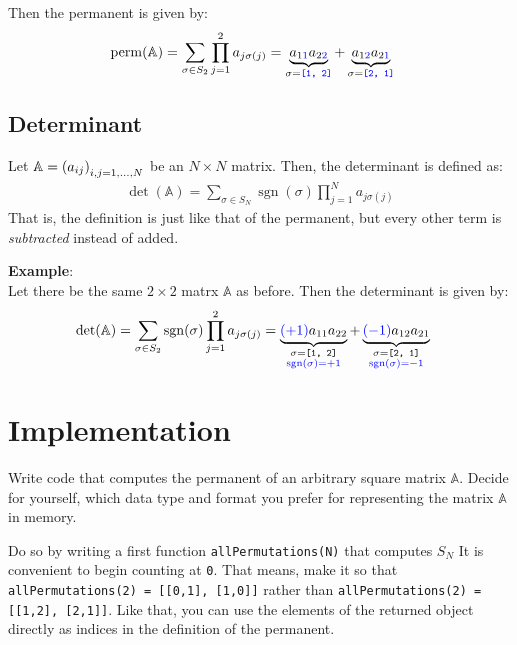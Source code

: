 \documentclass[
	english,
	fontsize=10pt,
	parskip=half,
	titlepage=true,
	DIV=12
]{scrartcl}
\newcommand*{\inPy}[1]{\texttt{#1}}
\DeclareMathOperator{\sgn}{sgn}
\DeclareMathOperator{\perm}{perm}
\begin{document}
Then the permanent is given by:
\begin{align*}
	\perm(\mathbb{A})
&=
	\sum_{\sigma \in S_2} \prod_{j=1}^2 a_{j\sigma(j)}
=
	\underbrace{
		a_{1{\color{blue}1}} a_{2{\color{blue}2}}
	}_{\sigma = {\color{blue}\texttt{[1, 2]}}}
	+
	\underbrace{
		a_{1{\color{blue}2}} a_{2{\color{blue}1}}
	}_{\sigma = {\color{blue}\texttt{[2, 1]}}}
\end{align*}

\subsection{Determinant}
Let $\mathbb{A} = \qty(a_{ij})_{i, j = 1, ..., N}$ be an $N \times N$ matrix. Then, the determinant is defined as:
\begin{align*}
	\det(\mathbb{A}) = \sum_{\sigma \in S_N} \sgn(\sigma) \prod_{j=1}^N a_{j\sigma(j)}
\end{align*}
That is, the definition is just like that of the permanent, but every other term is \emph{subtracted} instead of added.

\textbf{Example}:\\
Let there be the same $2 \times 2$ matrx $\mathbb{A}$ as before. Then the determinant is given by:
\begin{align*}
	\det(\mathbb{A})
&=
	\sum_{\sigma \in S_2} \sgn(\sigma) \prod_{j=1}^2 a_{j\sigma(j)}
=
	\underbrace{
		{\color{blue}(+1)} a_{11} a_{22}
	}_{\substack{
		\sigma = \texttt{[1, 2]}\\
		{\color{blue}\sgn(\sigma) = +1}
	}}
	+
	\underbrace{
		{\color{blue}(-1)} a_{12} a_{21}
	}_{\substack{
		\sigma = \texttt{[2, 1]}\\
		{\color{blue}\sgn(\sigma) = -1}
	}}
\end{align*}

\section{Implementation}
Write code that computes the permanent of an arbitrary square matrix $\mathbb{A}$. Decide for yourself, which data type and format you prefer for representing the matrix $\mathbb{A}$ in memory. 

Do so by writing a first function \texttt{allPermutations(N)} that computes $S_N$ It is convenient to begin counting at \inPy{0}. That means, make it so that 
\texttt{allPermutations(2) = [[0,1], [1,0]]} rather than \texttt{allPermutations(2) = [[1,2], [2,1]]}. Like that, you can use the elements of the returned object directly as indices in the definition of the permanent.
\end{document}
